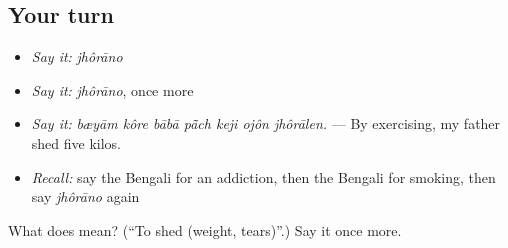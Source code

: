\subsection*{Your turn}
\begin{itemize}
\raggedright
  \item \emph{Say it:} \emph{jhôrāno}
  \item \emph{Say it:} \emph{jhôrāno}, once more
  \item \emph{Say it:} \emph{bæyām kôre bābā pā̃ch keji ojôn jhôrālen.} — By exercising, my father shed five kilos.
  \item \emph{Recall:} say the Bengali for an addiction, then the Bengali for smoking, then say \emph{jhôrāno} again
\end{itemize}

\begin{tcolorbox}[breakable,colback=teal!4,colframe=teal!35!black,title={Before you move on}]
What does  mean? (\textquotedblleft{}To shed (weight, tears)\textquotedblright{}.) Say it once more.
\end{tcolorbox}
